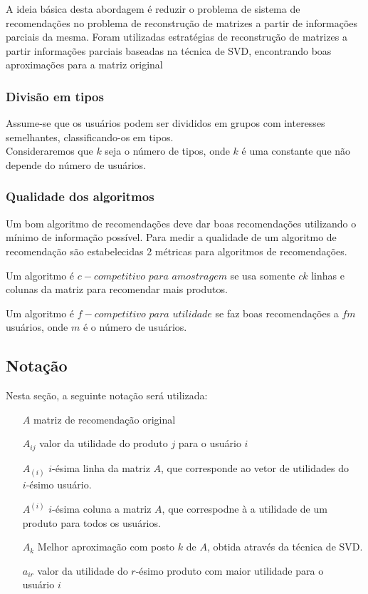 \documentclass[a4paper,10pt]{article}
\begin{document}
A ideia básica desta abordagem é reduzir o problema de sistema de recomendações
no problema de reconstrução de matrizes a partir de informações parciais da mesma. 
Foram utilizadas estratégias de reconstrução de matrizes a partir
informações parciais baseadas na técnica de SVD, encontrando boas aproximações
para a matriz original 

\subsubsection{Divisão em tipos}
Assume-se que os usuários podem ser divididos em grupos com interesses semelhantes,
classificando-os em tipos. \\ 

Consideraremos que $k$ seja o número de tipos, onde $k$ é
uma constante que não depende do número de usuários.

\subsubsection{Qualidade dos algoritmos}

Um bom algoritmo de recomendações deve dar boas recomendações utilizando o mínimo de 
informação possível. Para medir a qualidade de um algoritmo de recomendação
são estabelecidas 2 métricas para algoritmos de recomendações.

\begin{definicao}
 Um algoritmo é $c-competitivo$ $para$ $amostragem$ se usa somente $ck$
linhas e colunas da matriz para recomendar mais produtos.
\end{definicao}

\begin{definicao}
Um algoritmo é $f-competitivo$ $para$ $utilidade$
se faz boas recomendações a $fm$ usuários, onde $m$ é o número de usuários. 
\end{definicao}

\subsection{Notação}

Nesta seção, a seguinte notação será utilizada:

\begin{itemize}
\item[$A$] matriz de recomendação original
\item[$A_{ij}$] valor da utilidade do produto $j$ para o usuário $i$
\item[$A_{(i)}$] $i$-ésima linha da matriz $A$, que corresponde ao
vetor de utilidades do \\ $i$-ésimo usuário.
\item[$A^{(i)}$] $i$-ésima coluna a matriz $A$, que correspodne à 
a utilidade de um produto para todos os usuários.
\item[$A_k$] Melhor aproximação com posto $k$ de $A$, obtida através da técnica de SVD.
\item[$a_{ir}$] valor da utilidade do $r$-ésimo produto com maior utilidade
para o \\ usuário $i$ 
\end{itemize}
\end{document}
